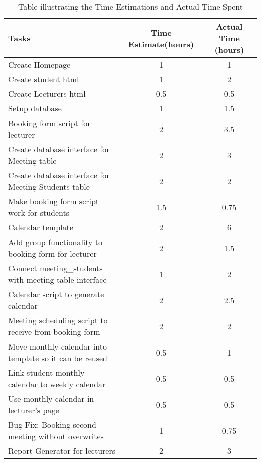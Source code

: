 \documentclass[11pt, a4paper]{article}
\begin{document}
	\begin{table}[!h]
		\centering
		\caption{Table illustrating the Time Estimations and Actual Time Spent}
		\label{time_estimations}
		\begin{tabular}{| l | c | c |}
			\hline
			Tasks & Time Estimate(hours) & Actual Time (hours) \\
			\hline \hline
			Create Homepage & 1 & 1 \\
			\hline
			Create student html & 1 & 2 \\
			\hline
			Create Lecturers html & 0.5 & 0.5\\
			Setup database & 1 & 1.5 \\
			\hline
			Booking form script for lecturer & 2 & 3.5 \\
			\hline
			Create database interface for Meeting table & 2 & 3\\
			\hline
			Create database interface for Meeting Students table & 2 & 2 \\
			\hline
			Make booking form script work for students & 1.5 & 0.75 \\
			\hline
			Calendar template & 2 & 6\\
			\hline
			Add group functionality to booking form for lecturer & 2 & 1.5 \\
			\hline
			Connect meeting\_students with meeting table interface & 1 & 2 \\
			\hline
			Calendar script to generate calendar & 2 & 2.5 \\
			\hline
			Meeting scheduling script to receive from booking form & 2 & 2\\
			\hline
			Move monthly calendar into template so it can be reused & 0.5 & 1 \\
			\hline
			Link student monthly calendar to weekly calendar & 0.5 & 0.5 \\
			\hline
			Use monthly calendar in lecturer's page & 0.5 & 0.5 \\
			\hline
			Bug Fix: Booking second meeting without overwrites & 1 & 0.75 \\
			\hline
			Report Generator for lecturers & 2 & 3 \\
			\hline
		\end{tabular}
	\end{table} 
	
\end{document}
